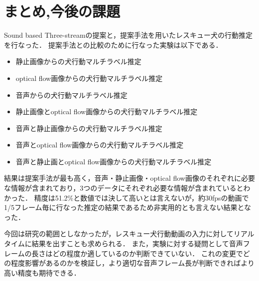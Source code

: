 \chapter{まとめ,今後の課題}
Sound based Three-streamの提案と，提案手法を用いたレスキュー犬の行動推定を行なった．
提案手法との比較のために行なった実験は以下である．
\begin{itemize}
  \item 静止画像からの犬行動マルチラベル推定
  \item optical flow画像からの犬行動マルチラベル推定
  \item 音声からの犬行動マルチラベル推定
  \item 静止画像とoptical flow画像からの犬行動マルチラベル推定
  \item 音声と静止画像からの犬行動マルチラベル推定
  \item 音声とoptical flow画像からの犬行動マルチラベル推定
  \item 音声と静止画とoptical flow画像からの犬行動マルチラベル推定
\end{itemize}
結果は提案手法が最も高く，音声・静止画像・optical flow画像のそれぞれに必要な情報が含まれており，3つのデータにそれぞれ必要な情報が含まれているとわかった．
精度は51.2\%と数値では決して高いとは言えないが，約30fpsの動画で1/5フレーム毎に行なった推定の結果であるため非実用的とも言えない結果となった．

今回は研究の範囲としなかったが，レスキュー犬行動動画の入力に対してリアルタイムに結果を出すことも求められる．
また，実験に対する疑問として音声フレームの長さはどの程度か適しているのか判断できていない．
これの変更でどの程度影響があるのかを検証し，より適切な音声フレーム長が判断できればより高い精度も期待できる．

%


% 
% 


